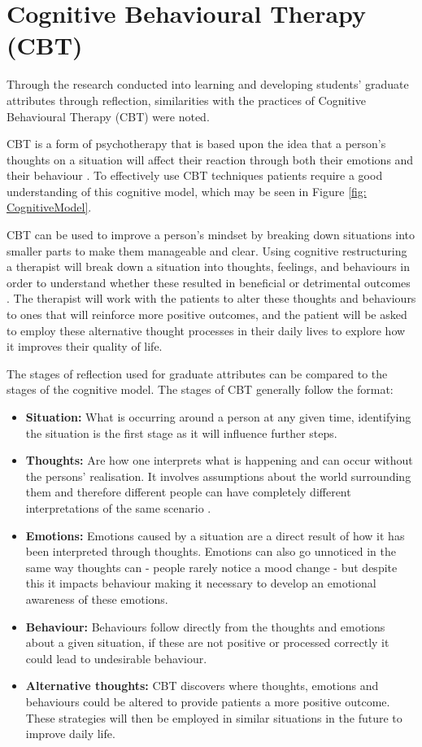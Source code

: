 \documentclass{l4proj}
\begin{document}
\section{Cognitive Behavioural Therapy (CBT)}

Through the research conducted into learning and developing students' graduate attributes through reflection, similarities with the practices of Cognitive Behavioural Therapy (CBT) were noted. 

CBT is a form of psychotherapy that is based upon the idea that a person's thoughts on a situation will affect their reaction through both their emotions and their behaviour \citep{whatisCBT_therapistAid}. To effectively use CBT techniques patients require a good understanding of this cognitive model, which may be seen in Figure \ref{fig: CognitiveModel}. 

CBT can be used to improve a person's mindset by breaking down situations into smaller parts to make them manageable and clear. Using cognitive restructuring a therapist will break down a situation into thoughts, feelings, and behaviours in order to understand whether these resulted in beneficial or detrimental outcomes \citep{nhs_cognitive_2017}. The therapist will work with the patients to alter these thoughts and behaviours to ones that will reinforce more positive outcomes, and the patient will be asked to employ these alternative thought processes in their daily lives to explore how it improves their quality of life.


The stages of reflection used for graduate attributes can be compared to the stages of the cognitive model. The stages of CBT generally follow the format:
\begin{itemize}
    \item \textbf{Situation:} What is occurring around a person at any given time, identifying the situation is the first stage as it will influence further steps.
    \item \textbf{Thoughts:} Are how one interprets what is happening and can occur without the persons' realisation. It involves assumptions about the world surrounding them and therefore different people can have completely different interpretations of the same scenario \citep{therapist_aid_psychoeducation}. 
    \item \textbf{Emotions:} Emotions caused by a situation are a direct result of how it has been interpreted through thoughts. Emotions can also go unnoticed in the same way thoughts can - people rarely notice a mood change - but despite this it impacts behaviour making it necessary to develop an emotional awareness of these emotions.
    \item \textbf{Behaviour:} Behaviours follow directly from the thoughts and emotions about a given situation, if these are not positive or processed correctly it could lead to undesirable behaviour.
    \item \textbf{Alternative thoughts:} CBT discovers where thoughts, emotions and behaviours could be altered to provide patients a more positive outcome. These strategies will then be employed in similar situations in the future to improve daily life.
\end{itemize}
\end{document}
